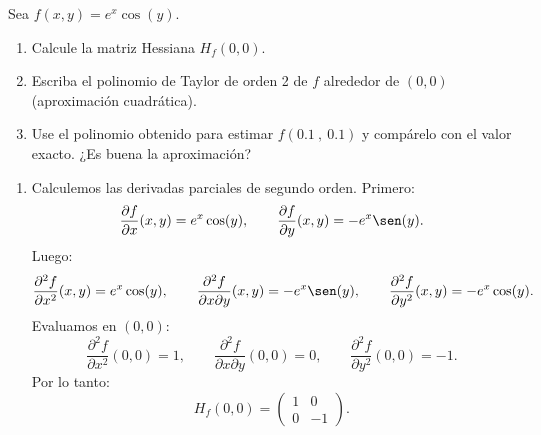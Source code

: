 \documentclass[11pt,respuestas,a4]{aleph-examen}
\begin{document}
\begin{preguntas}
\item
Sea $f(x,y) = e^{x}\cos(y)$.
\begin{enumerate}
    \item Calcule la matriz Hessiana $H_f(0,0)$.
    \item Escriba el polinomio de Taylor de orden 2 de $f$ alrededor de $(0,0)$ (aproximación cuadrática).
    \item Use el polinomio obtenido para estimar $f(0.1\ ,\ 0.1)$ y compárelo con el valor exacto. ¿Es buena la aproximación?
\end{enumerate}

\begin{respuesta}
\begin{enumerate}
    \item Calculemos las derivadas parciales de segundo orden. Primero:
    \[
        \frac{\partial f}{\partial x}(x,y)
        =
        e^x\cos(y),
        \qquad
        \frac{\partial f}{\partial y}(x,y)
        =
        -e^x\sen(y).
    \]
    Luego:
    \[
        \frac{\partial^2 f}{\partial x^2}(x,y)
        =
        e^x\cos(y),
        \qquad
        \frac{\partial^2 f}{\partial x\partial y}(x,y)
        =
        -e^x\sen(y),
        \qquad
        \frac{\partial^2 f}{\partial y^2}(x,y)
        =
        -e^x\cos(y).
    \]
    Evaluamos en \((0,0)\):
    \[
        \frac{\partial^2 f}{\partial x^2}(0,0)
        =
        1,
        \qquad
        \frac{\partial^2 f}{\partial x\partial y}(0,0)
        =
        0,
        \qquad
        \frac{\partial^2 f}{\partial y^2}(0,0)
        =
        -1.
    \]
    Por lo tanto:
    \[
        H_f(0,0)
        =
        \begin{pmatrix}
            1 & 0\\
            0 & -1
        \end{pmatrix}.
    \]


\end{enumerate}
\end{respuesta}
\end{preguntas}
\end{document}
